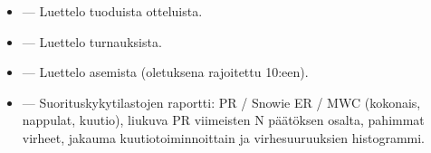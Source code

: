 \documentclass[letterpaper,10pt,finnish]{sphinxmanual}
\begin{document}
\sphinxAtStartPar
{}
\begin{itemize}
\item {} 
\sphinxAtStartPar
{} — Luettelo tuoduista otteluista.

\item {} 
\sphinxAtStartPar
{} — Luettelo turnauksista.

\item {} 
\sphinxAtStartPar
{} — Luettelo asemista (oletuksena rajoitettu 10:een).

\item {} 
\sphinxAtStartPar
{} — Suorituskykytilastojen raportti: PR / Snowie ER / MWC (kokonais, nappulat, kuutio), liukuva PR viimeisten N päätöksen osalta, pahimmat virheet, jakauma kuutiotoiminnoittain ja virhesuuruuksien histogrammi.

\end{itemize}
\end{document}
